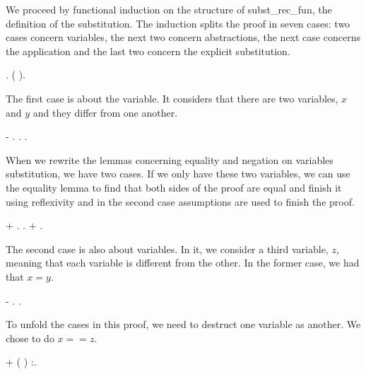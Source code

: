  We proceed by functional induction on the structure of subst\_rec\_fun, the definition of the substitution. The induction splits the proof in seven cases: two cases concern variables, the next two concern abstractions, the next case concerns the application and the last two concern the explicit substitution. 
\begin{coqdoccode}
\coqdocindent{1.00em}
   .   (   ).\coqdoceol
\end{coqdoccode}
The first case is about the variable. It considers that there are two variables, $x$ and $y$ and they differ from one another. 
\begin{coqdoccode}
\coqdocindent{1.00em}
-     .  .  .\coqdoceol
\end{coqdoccode}
When we rewrite the lemmas concerning equality and negation on variables substitution, we have two cases. If we only have these two variables, we can use the equality lemma to find that both sides of the proof are equal and finish it using reflexivity and in the second case assumptions are used to finish the proof.
\begin{coqdoccode}
\coqdocindent{2.00em}
+  .  .\coqdoceol
\coqdocindent{2.00em}
+ .\coqdoceol
\end{coqdoccode}
The second case is also about variables. In it, we consider a third variable, $z$, meaning that each variable is different from the other. In the former case, we had that $x = y$.
\begin{coqdoccode}
\coqdocindent{1.00em}
-     .  .\coqdoceol
\end{coqdoccode}
To unfold the cases in this proof, we need to destruct one variable as another. We chose to do $x == z$.
\begin{coqdoccode}
\coqdocindent{2.00em}
+  ( \coqdocnotation{==} ) :.\coqdoceol
\end{coqdoccode}

